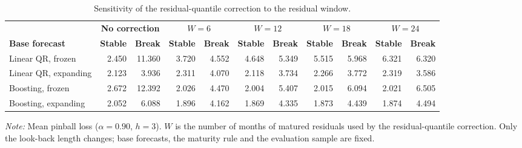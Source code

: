 \begin{table}[t]
\caption{Sensitivity of the residual-quantile correction to the residual window.\label{tab:windows}}
\centering\footnotesize\setlength{\tabcolsep}{3pt}
\begin{tabular*}{\textwidth}{@{\extracolsep\fill}lrrrrrrrrrr@{}}
\toprule
 & \multicolumn{2}{c}{\textbf{No correction}} & \multicolumn{2}{c}{\textbf{$W=6$}} & \multicolumn{2}{c}{\textbf{$W=12$}} & \multicolumn{2}{c}{\textbf{$W=18$}} & \multicolumn{2}{c}{\textbf{$W=24$}} \\
\cmidrule(lr){2-3}\cmidrule(lr){4-5}\cmidrule(lr){6-7}\cmidrule(lr){8-9}\cmidrule(l){10-11}
\textbf{Base forecast} & \textbf{Stable} & \textbf{Break} & \textbf{Stable} & \textbf{Break} & \textbf{Stable} & \textbf{Break} & \textbf{Stable} & \textbf{Break} & \textbf{Stable} & \textbf{Break} \\
\midrule
Linear QR, frozen & 2.450 & 11.360 & 3.720 & 4.552 & 4.648 & 5.349 & 5.515 & 5.968 & 6.321 & 6.320 \\
Linear QR, expanding & 2.123 & 3.936 & 2.311 & 4.070 & 2.118 & 3.734 & 2.266 & 3.772 & 2.319 & 3.586 \\
Boosting, frozen & 2.672 & 12.392 & 2.026 & 4.470 & 2.004 & 5.407 & 2.015 & 6.094 & 2.021 & 6.505 \\
Boosting, expanding & 2.052 & 6.088 & 1.896 & 4.162 & 1.869 & 4.335 & 1.873 & 4.439 & 1.874 & 4.494 \\
\bottomrule
\end{tabular*}
\begin{tablenotes}
\item \textit{Note:} Mean pinball loss ($\alpha=0.90$, $h=3$). $W$ is the number of months of matured residuals used by the residual-quantile correction. Only the look-back length changes; base forecasts, the maturity rule and the evaluation sample are fixed.
\end{tablenotes}
\end{table}
